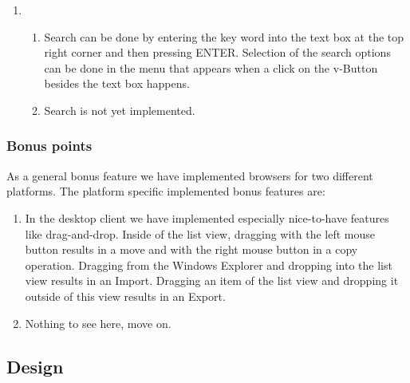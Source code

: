 \documentclass[a4paper,12pt]{article}
\begin{document}
\begin{enumerate}
\begin{enumerate} [label={(\alph*)}]
		\item Mouse navigation is supported in the expected way. In the list view double click on a folder means going into this folder. Going to the parent folder can be done by clicking on the Back-Button.
		\item Single click on a folder to enter it, click the up button to go to the parent folder.
		\end{enumerate}
	\item
		\begin{enumerate} [label={(\alph*)}]
		\item Search can be done by entering the key word into the text box at the top right corner and then pressing ENTER. Selection of the search options can be done in the menu that appears when a click on the v-Button besides the text box happens.
		\item Search is not yet implemented.
		\end{enumerate}
\end{enumerate}

\subsubsection{Bonus points}
As a general bonus feature we have implemented browsers for two different platforms. The platform specific implemented bonus features are:
		\begin{enumerate} [label={(\alph*)}]
		\item In the desktop client we have implemented especially nice-to-have features like drag-and-drop. Inside of the list view, dragging with the left mouse button results in a move and with the right mouse button in a copy operation. Dragging from the Windows Explorer and dropping into the list view results in an Import. Dragging an item of the list view and dropping it outside of this view results in an Export.
		\item Nothing to see here, move on.
		\end{enumerate}

\subsection{Design}
\end{document}
